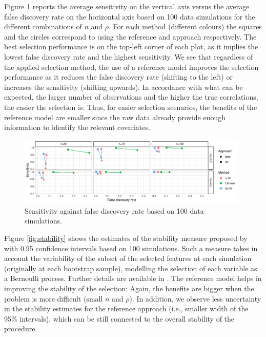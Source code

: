 \documentclass[american,]{article}
\theoremstyle{definition}
\begin{document}
Figure \ref{fig:sensitivity_vs_fdr} reports the average sensitivity on
the vertical axis versus the average false discovery rate on the
horizontal axis based on 100 data simulations for the different
combinations of $n$ and $\rho$. For each method (different colours)
the squares and the circles correspond to using the reference and
approach respectively. The best selection performance is on the
top-left corner of each plot, as it implies the lowest false discovery
rate and the highest sensitivity. We see that regardless of the
applied selection method, the use of a reference model improves the
selection performance as it reduces the false discovery rate (shifting
to the left) or increases the sensitivity (shifting upwards). In
accordance with what can be expected, the larger number of
observations and the higher the true correlations, the easier the
selection is. Thus, for easier selection scenarios, the benefits of
the reference model are smaller since the raw data already provide
enough information to identify the relevant covariates.

\begin{figure}[tp]
  \centering
  \includegraphics[width=0.98\textwidth]{graphics/sensitivity_vs_fdr.pdf}
  \caption{Sensitivity against false discovery rate based on 100 data simulations.\\}
  \label{fig:sensitivity_vs_fdr}
\end{figure}

Figure \ref{fig:stability} shows the estimates of the stability
measure proposed by \cite{paper:stability} with 0.95 confidence
intervals based on 100 simulations. Such a measure takes in account
the variability of the subset of the selected features at each
simulation (originally at each bootstrap sample), modelling the
selection of each variable as a Bernoulli process. Further details are
available in \cite{paper:stability}. The reference model helps in
improving the stability of the selection: Again, the benefits are
bigger when the problem is more difficult (small $n$ and $\rho$). In
addition, we observe less uncertainty in the stability estimates for
the reference approach (i.e., smaller width of the 95\% intervals),
which can be still connected to the overall stability of the
procedure.
\end{document}
